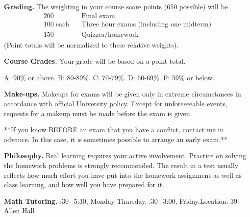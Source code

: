 \documentclass[12pt]{article}
\begin{document}
\vspace{0.15in}
\noindent
{\bf Grading.} 
The weighting in your course score  points (650 possible) will be 
$$
\begin{array}{ll}
200 \quad   & \text{Final exam}\\          
100\; \text{each} \quad & \text{Three hour exams (including one midterm)}\\    
  150   \quad & \text{Quizzes/homework }
\end{array}
$$
  (Point totals will be normalized to these relative weights). 

\vspace{0.15in}
\noindent
{\bf Course Grades.} 
Your grade will be based on a point total.

A: 90$\%$ or above. \quad B: 80-89$\%$. \quad C: 70-79$\%$. \quad D: 60-69$\%$.\quad 
F: 59$\%$ or below.

\newpage
\vspace{0.215in}
\noindent
{\bf Make-ups.} Makeups for exams will be given
only in extreme circumstances in
accordance with official University policy. Except for unforeseeable
events, requests for a makeup must be made
before the exam is given. 

**If you know BEFORE an exam that you have a conflict, 
contact me in advance. In this case, it is sometimes 
possible to arrange an early exam.**

\vspace{0.19in}
\noindent
{\bf Philosophy.} 
Real learning requires your active involvement. 
Practice on solving the homework problems is strongly recommended.
The result in a test usually reflects how much effort you have put into 
the homework assignment as well as class learning, and how well you have prepared for it. 


\vspace{0.195in}
\noindent
{\bf  Math Tutoring.} :30$ - $5:30, Monday-Thursday. :30$ - $3:00, Friday.\qquad Location:  39 Allen Hall 


\end{document}
